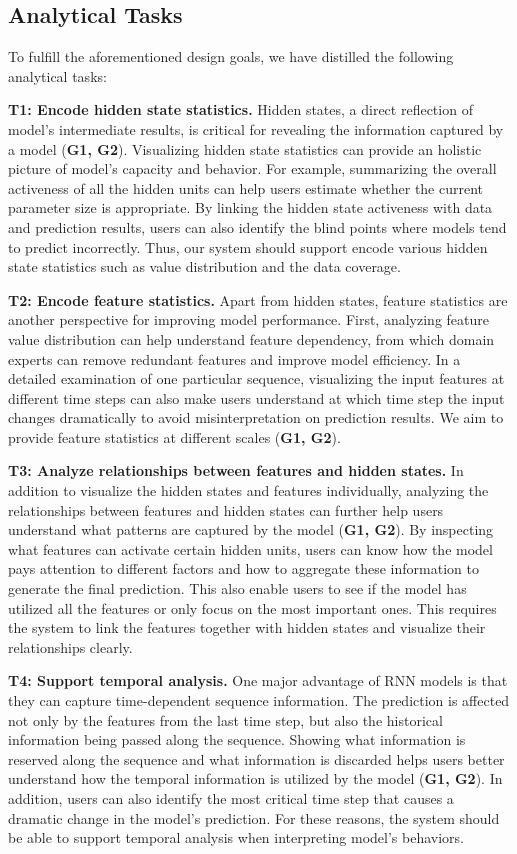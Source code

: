 \subsection{Analytical Tasks}
To fulfill the aforementioned design goals, we have distilled the following analytical tasks:

\textbf{T1: Encode hidden state statistics.}
Hidden states, a direct reflection of model's intermediate results, is critical for revealing the information captured by a model (\textbf{G1, G2}).
Visualizing hidden state statistics can provide an holistic picture of model's capacity and behavior.
For example, summarizing the overall activeness of all the hidden units can help users estimate whether the current parameter size is appropriate.
By linking the hidden state activeness with data and prediction results, users can also identify the blind points where models tend to predict incorrectly.
Thus, our system should support encode various hidden state statistics such as value distribution and the data coverage.

\textbf{T2: Encode feature statistics.}
Apart from hidden states, feature statistics are another perspective for improving model performance.
First, analyzing feature value distribution can help understand feature dependency, from which domain experts can remove redundant features and improve model efficiency.
In a detailed examination of one particular sequence, visualizing the input features at different time steps can also make users understand at which time step the input changes dramatically to avoid misinterpretation on prediction results.
We aim to provide feature statistics at different scales (\textbf{G1, G2}).

\textbf{T3: Analyze relationships between features and hidden states.}
In addition to visualize the hidden states and features individually, analyzing the relationships between features and hidden states can further help users understand what patterns are captured by the model (\textbf{G1, G2}).
By inspecting what features can activate certain hidden units, users can know how the model pays attention to different factors and how to aggregate these information to generate the final prediction.
This also enable users to see if the model has utilized all the features or only focus on the most important ones.
This requires the system to link the features together with hidden states and visualize their relationships clearly.

\textbf{T4: Support temporal analysis.}
One major advantage of RNN models is that they can capture time-dependent sequence information.
The prediction is affected not only by the features from the last time step, but also the historical information being passed along the sequence.
Showing what information is reserved along the sequence and what information is discarded helps users better understand how the temporal information is utilized by the model (\textbf{G1, G2}).
In addition, users can also identify the most critical time step that causes a dramatic change in the model's prediction.
For these reasons, the system should be able to support temporal analysis when interpreting model's behaviors.


